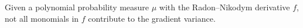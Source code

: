 \documentclass[%
 superscriptaddress,
 aps,prl,
 reprint,
 twocolumn,
 amsmath,amssymb,showpacs,
 bibnotes,
]{revtex4-2}
\newcommand{\RomanNumeralCaps}[1]
    {\MakeUppercase{\romannumeral #1}}
\begin{document}
Given a polynomial probability measure $\mu$ with the Radon–Nikodym derivative $f$, not all monomials in $f$ contribute to the gradient variance. 
\end{document}
